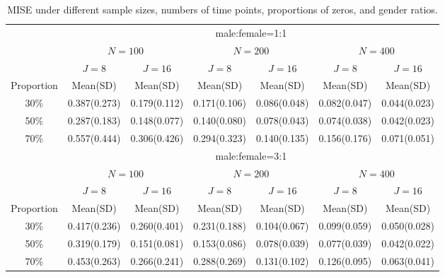\newpage
\begin{table}[htbp]
\footnotesize
\begin{center}
\caption{MISE under different sample sizes, numbers of time
points, proportions of zeros, and gender ratios.}
\begin{tabular}{c|cc|cc|cc}
 
&\multicolumn{6}{c}{male:female=1:1}\\ 
& \multicolumn{2}{c|}{$N=100$}& \multicolumn{2}{c|}{$N=200$}& \multicolumn{2}{c}{$N=400$}\\
&$J=8$&$J=16$&$J=8$&$J=16$&$J=8$&$J=16$\\
 Proportion & Mean(SD) & Mean(SD) & Mean(SD) & Mean(SD) &
Mean(SD) & Mean(SD)\\
 30\%&0.387(0.273) &
0.179(0.112)&0.171(0.106) &0.086(0.048) &0.082(0.047) &
0.044(0.023)       \\ 
50\% & 0.287(0.183)        & 0.148(0.077)         &  0.140(0.080)        &   0.078(0.043)       &   0.074(0.038)       & 0.042(0.023)         \\
70\% &  0.557(0.444)       &   0.306(0.426)       &  0.294(0.323)        &  0.140(0.135)        &  0.156(0.176)        & 0.071(0.051)    \\
 &\multicolumn{6}{c}{male:female=3:1}\\ 
& \multicolumn{2}{c|}{$N=100$}& \multicolumn{2}{c|}{$N=200$}& \multicolumn{2}{c}{$N=400$}\\

&$J=8$&$J=16$&$J=8$&$J=16$&$J=8$&$J=16$\\
 Proportion & Mean(SD) & Mean(SD) & Mean(SD) & Mean(SD) &
Mean(SD) & Mean(SD)\\
 
 30\%&0.417(0.236) &0.260(0.401)&0.231(0.188) &0.104(0.067) &0.099(0.059) &0.050(0.028)       \\
50\% & 0.319(0.179)        & 0.151(0.081)         &  0.153(0.086)        &   0.078(0.039)       &   0.077(0.039)       & 0.042(0.022)         \\
70\% &  0.453(0.263)       &   0.266(0.241)       &  0.288(0.269)        &  0.131(0.102)        &  0.126(0.095)        & 0.063(0.041)    \\

\end{tabular}
\end{center}
\normalsize
\end{table}





